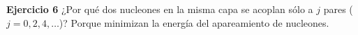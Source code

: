 

\begin{texercise}
    \textbf{Ejercicio 6}
    ¿Por qué dos nucleones en la misma capa se acoplan sólo a $j$ pares ($j = 0, 2, 4, \dots$)?
\tcblower
    Porque minimizan la energía del apareamiento de nucleones.
\end{texercise}





